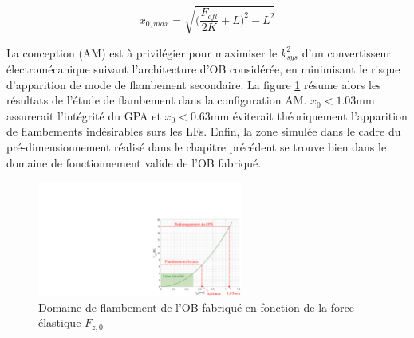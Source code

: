 \begin{equation}
	x_{0,max} = \sqrt{\biggl(\dfrac{F_{cfl}}{2K} + L\biggr)^2 - L^2}
	\label{x0_max}
\end{equation}
\begin{table}[H]
	\centering
	\captionsetup{justification=centering}
	\caption{Niveau de flambement maximal à privilégier sur l'OB en fonction des conceptions des LFs}
	\label{tab:x0max}
\end{table}

La conception (AM) est à privilégier pour maximiser le $k_{sys}^2$ d'un convertisseur électromécanique suivant l'architecture d'OB considérée, en minimisant le risque d'apparition de mode de flambement secondaire. La figure \ref{fig:Fz(x0)_resultats} résume alors les résultats de l'étude de flambement dans la configuration AM. $x_0<1.03$mm assurerait l'intégrité du GPA et $x_0<0.63$mm éviterait théoriquement l'apparition de flambements indésirables surs les LFs. Enfin, la zone simulée dans le cadre du pré-dimensionnement réalisé dans le chapitre précédent se trouve bien dans le domaine de fonctionnement valide de l'OB fabriqué.
\begin{figure}[!htb]
	\begin{center}
		\captionsetup{justification=centering}
		\includegraphics[trim={19cm 0cm 0cm 6cm},clip,width=0.6\textwidth]{../Chap3/Figure/Fz(x0)_resultats.pdf}
		\caption{Domaine de flambement de l'OB fabriqué en fonction de la force élastique $F_{z,0}$}
		\label{fig:Fz(x0)_resultats}
	\end{center}
\end{figure}


